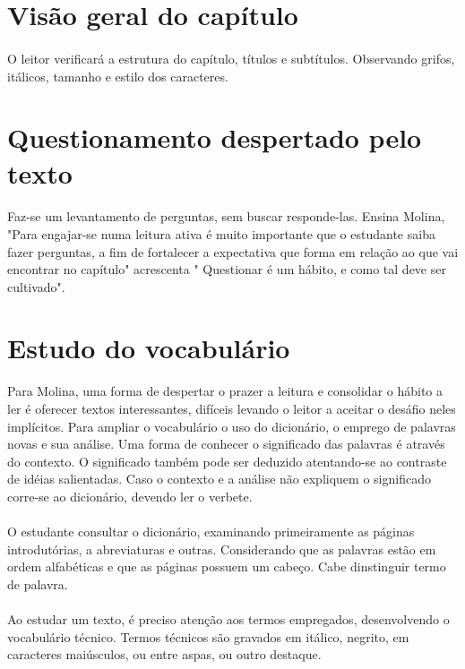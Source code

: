 \section{Visão geral do capítulo}

\paragraph{}
O leitor verificará a estrutura do capítulo, títulos e subtítulos. Observando grifos, itálicos, tamanho e estilo dos caracteres.

\section{Questionamento despertado pelo texto}

\paragraph{}
Faz-se  um levantamento de perguntas, sem buscar responde-las. Ensina Molina, "Para engajar-se numa leitura ativa é muito importante que o estudante saiba fazer perguntas, a fim de fortalecer a expectativa que forma em relação ao que vai encontrar no capítulo" acrescenta " Questionar é um hábito, e como tal deve ser cultivado".

\section{Estudo do vocabulário}
Para Molina, uma forma de despertar o prazer a leitura e consolidar o hábito a ler é oferecer textos interessantes, difíceis levando o leitor a aceitar o desáfio neles implícitos. Para ampliar o vocabulário o uso do dicionário, o emprego de palavras novas e sua análise. Uma forma de conhecer o significado das palavras é através do contexto. O significado também pode ser deduzido atentando-se ao contraste de idéias salientadas. Caso o contexto e a análise não expliquem o significado corre-se ao dicionário, devendo ler o verbete.

\paragraph{}
O estudante consultar o dicionário, examinando primeiramente as páginas introdutórias, a abreviaturas e outras. Considerando que as palavras estão em ordem alfabéticas e que as páginas possuem um cabeço. Cabe dinstinguir termo de palavra.

\paragraph{}
Ao estudar um texto, é preciso atenção aos termos empregados, desenvolvendo o vocabulário técnico. Termos técnicos são gravados em itálico, negrito, em caracteres maiúsculos, ou entre aspas, ou outro destaque.

